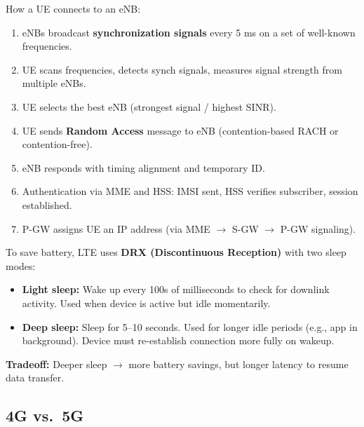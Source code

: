 \begin{keybox}
How a UE connects to an eNB:
\begin{enumerate}[noitemsep]
    \item eNBs broadcast \textbf{synchronization signals} every 5 ms on a set of well-known frequencies.
    \item UE scans frequencies, detects synch signals, measures signal strength from multiple eNBs.
    \item UE selects the best eNB (strongest signal / highest SINR).
    \item UE sends \textbf{Random Access} message to eNB (contention-based RACH or contention-free).
    \item eNB responds with timing alignment and temporary ID.
    \item Authentication via MME and HSS: IMSI sent, HSS verifies subscriber, session established.
    \item P-GW assigns UE an IP address (via MME $\rightarrow$ S-GW $\rightarrow$ P-GW signaling).
\end{enumerate}
\end{keybox}

\begin{keybox}
To save battery, LTE uses \textbf{DRX (Discontinuous Reception)} with two sleep modes:
\begin{itemize}[noitemsep]
    \item \textbf{Light sleep:} Wake up every 100s of milliseconds to check for downlink activity. Used when device is active but idle momentarily.
    \item \textbf{Deep sleep:} Sleep for 5--10 seconds. Used for longer idle periods (e.g., app in background). Device must re-establish connection more fully on wakeup.
\end{itemize}
\textbf{Tradeoff:} Deeper sleep $\rightarrow$ more battery savings, but longer latency to resume data transfer.
\end{keybox}

\subsection{4G vs.\ 5G}


